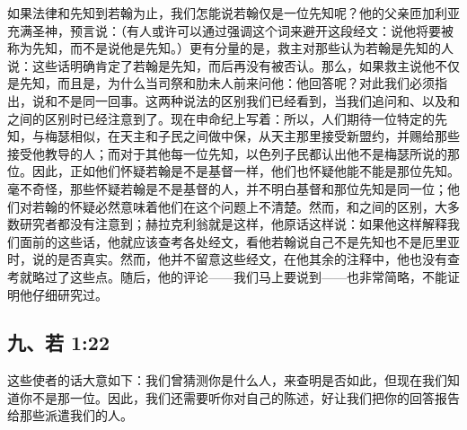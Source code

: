 如果法律和先知到若翰为止，我们怎能说若翰仅是一位先知呢？他的父亲匝加利亚充满圣神，预言说：（有人或许可以通过强调这个词来避开这段经文：说他将要被称为先知，而不是说他是先知。）更有分量的是，救主对那些认为若翰是先知的人说：这些话明确肯定了若翰是先知，而后再没有被否认。那么，如果救主说他不仅是先知，而且是，为什么当司祭和肋未人前来问他：他回答呢？对此我们必须指出，说和不是同一回事。这两种说法的区别我们已经看到，当我们追问和、以及和之间的区别时已经注意到了。现在申命纪上写着：所以，人们期待一位特定的先知，与梅瑟相似，在天主和子民之间做中保，从天主那里接受新盟约，并赐给那些接受他教导的人；而对于其他每一位先知，以色列子民都认出他不是梅瑟所说的那位。因此，正如他们怀疑若翰是不是基督一样，他们也怀疑他能不能是那位先知。毫不奇怪，那些怀疑若翰是不是基督的人，并不明白基督和那位先知是同一位；他们对若翰的怀疑必然意味着他们在这个问题上不清楚。然而，和之间的区别，大多数研究者都没有注意到；赫拉克利翁就是这样，他原话这样说：如果他这样解释我们面前的这些话，他就应该查考各处经文，看他若翰说自己不是先知也不是厄里亚时，说的是否真实。然而，他并不留意这些经文，在他其余的注释中，他也没有查考就略过了这些点。随后，他的评论——我们马上要说到——也非常简略，不能证明他仔细研究过。\par


\subsection{九、若 1:22}

这些使者的话大意如下：我们曾猜测你是什么人，来查明是否如此，但现在我们知道你不是那一位。因此，我们还需要听你对自己的陈述，好让我们把你的回答报告给那些派遣我们的人。\par

